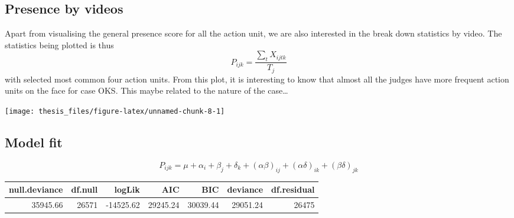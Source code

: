 \documentclass{monashthesis}
\begin{document}
\hypertarget{presence-by-videos}{%
\subsection{Presence by videos}\label{presence-by-videos}}

Apart from visualising the general presence score for all the action unit, we are also interested in the break down statistics by video. The statistics being plotted is thus \[P_{ijk} = \frac{\sum_{t}X_{ijtk}}{T_j}\] with selected most common four action units. From this plot, it is interesting to know that almost all the judges have more frequent action units on the face for case OKS. This maybe related to the nature of the case\ldots{}

\texttt{[image: thesis\_files/figure-latex/unnamed-chunk-8-1]}

\hypertarget{model-fit-1}{%
\subsection{Model fit}\label{model-fit-1}}

\[P_{ijk} = \mu + \alpha_i + \beta_j +\delta_k + (\alpha\beta)_{ij}+(\alpha\delta)_{ik} + (\beta\delta)_{jk}\]

\begin{tabular}{r|r|r|r|r|r|r}
\hline
null.deviance & df.null & logLik & AIC & BIC & deviance & df.residual\\
\hline
35945.66 & 26571 & -14525.62 & 29245.24 & 30039.44 & 29051.24 & 26475\\
\hline
\end{tabular}
\end{document}

